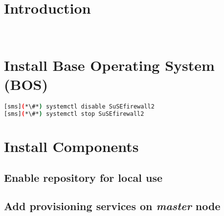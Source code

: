 \documentclass[letterpaper]{article}
\begin{document}
\graphicspath{{common/figures/}}
\thispagestyle{empty}


 

\newpage
\tableofcontents
\newpage


\section{Introduction} \label{sec:introduction}

 \\







\section{Install Base Operating System (BOS)}


\clearpage
\begin{lstlisting}[language=bash,keywords={}]
[sms](*\#*) systemctl disable SuSEfirewall2
[sms](*\#*) systemctl stop SuSEfirewall2
\end{lstlisting}


\section{Install \OHPC{} Components} \label{sec:basic_install}


\subsection{Enable \OHPC{} repository for local use} \label{sec:enable_repo}




\subsection{Add provisioning services on {\em master} node} \label{sec:add_provisioning}



\end{document}
